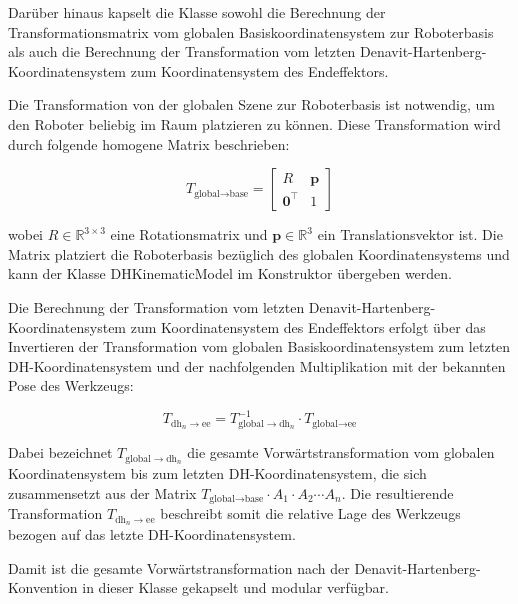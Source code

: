 Darüber hinaus kapselt die Klasse sowohl die Berechnung der Transformationsmatrix vom globalen Basiskoordinatensystem zur Roboterbasis
als auch die Berechnung der Transformation vom letzten Denavit-Hartenberg-Koordinatensystem zum Koordinatensystem des Endeffektors.



Die Transformation von der globalen Szene zur Roboterbasis ist notwendig, um den Roboter beliebig im Raum platzieren zu können.
Diese Transformation wird durch folgende homogene Matrix beschrieben:


\begin{equation}
    T_{\text{global} \rightarrow \text{base}} =
    \begin{bmatrix}
    R & \mathbf{p} \\
    \mathbf{0}^\top & 1
    \end{bmatrix}
\end{equation}

wobei \( R \in \mathbb{R}^{3 \times 3} \) eine Rotationsmatrix und \( \mathbf{p} \in \mathbb{R}^3 \) ein Translationsvektor ist.
Die Matrix platziert die Roboterbasis bezüglich des globalen Koordinatensystems und kann der Klasse DHKinematicModel im Konstruktor übergeben werden.


Die Berechnung der Transformation vom letzten Denavit-Hartenberg-Koordinatensystem zum Koordinatensystem des Endeffektors 
erfolgt über das Invertieren der Transformation vom globalen Basiskoordinatensystem zum letzten DH-Koordinatensystem und der nachfolgenden
Multiplikation mit der bekannten Pose des Werkzeugs:

\begin{equation}
    T_{\text{dh}_n \rightarrow \text{ee}} = T_{\text{global} \rightarrow \text{dh}_n}^{-1} \cdot T_{\text{global} \rightarrow \text{ee}}
\end{equation}

Dabei bezeichnet \( T_{\text{global} \rightarrow \text{dh}_n} \) die gesamte Vorwärtstransformation vom globalen Koordinatensystem bis zum letzten DH-Koordinatensystem,
die sich zusammensetzt aus der Matrix \( T_{\text{global} \rightarrow \text{base}} \cdot A_1 \cdot A_2 \cdots A_n \).
Die resultierende Transformation \( T_{\text{dh}_n \rightarrow \text{ee}} \) beschreibt somit die relative Lage des Werkzeugs bezogen auf das letzte DH-Koordinatensystem.

Damit ist die gesamte Vorwärtstransformation nach der Denavit-Hartenberg-Konvention in dieser Klasse gekapselt und modular verfügbar.

